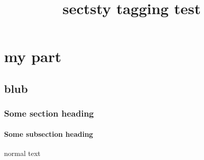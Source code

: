 \documentclass{book}
\title{sectsty tagging test}
\begin{document}
\part{my part}
\chapter{blub}
\section{Some section heading}
\subsection{Some subsection heading}
normal text
\end{document}
